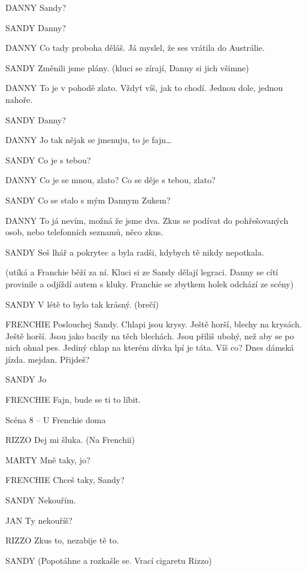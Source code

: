 DANNY        Sandy?

SANDY        Danny?

DANNY        Co tady proboha děláš. Já myslel, že ses vrátila do Austrálie. 

SANDY        Změnili jsme plány. (kluci se zírají, Danny si jich všimne)

DANNY        To je v pohodě zlato. Vždyť víš, jak to chodí. Jednou dole, jednou nahoře. 

SANDY        Danny?

DANNY        Jo tak nějak se jmenuju, to je fajn…

SANDY        Co je s tebou?

DANNY        Co je se mnou, zlato? Co se děje s tebou, zlato?

SANDY        Co se stalo s mým Dannym Zukem?

DANNY        To já nevím, možná že jsme dva. Zkus se podívat do pohřešovaných                 osob, nebo telefonních seznamů, něco zkus.

SANDY        Seš lhář a pokrytec a byla radši, kdybych tě nikdy nepotkala.

        (utíká a Franchie běží za ní. Kluci si ze Sandy dělají legraci. Danny se cítí         provinile a odjíždí autem s kluky. Franchie se zbytkem holek odchází ze scény) 

SANDY        V létě to bylo tak krásný. (brečí)

FRENCHIE         Poslouchej Sandy. Chlapi jsou krysy. Ještě horší, blechy na krysách.                 Ještě horší. Jsou jako bacily na těch blechách. Jsou příliš ubohý, než aby         se po nich ohnal pes. Jediný chlap na kterém dívka lpí je táta. Víš co?         Dnes dámská jízda. mejdan. Přijdeš?

SANDY        Jo

FRENCHIE         Fajn, bude se ti to líbit. 

Scéna 8 – U Frenchie doma 

RIZZO                Dej mi šluka. (Na Frenchii)

MARTY                Mně taky, jo? 

FRENCHIE                Chceš taky, Sandy?

SANDY                Nekouřím.

JAN                Ty nekouříš?

RIZZO                Zkus to, nezabije tě to.

SANDY                (Popotáhne a rozkašle se. Vrací cigaretu Rizzo)

